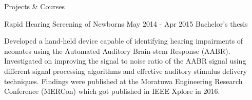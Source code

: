 \documentclass[
	11pt, %
]{./../assets/resume} %
\begin{document}
\begin{rSection}{Projects \& Courses}
    \begin{rShortProject}
    {Rapid Hearing Screening of Newborns}
    {May 2014 - Apr 2015} {Bachelor's thesis}
        \item
        Developed a hand-held device capable of identifying hearing impairments of neonates using the Automated Auditory Brain-stem Response (AABR). Investigated on improving the signal to noise ratio of the AABR signal using different signal processing algorithms and effective auditory stimulus delivery techniques. Findings were published at the Moratuwa Engineering Research Conference (MERCon) which got published in IEEE Xplore in 2016.
    \end{rShortProject}





\end{rSection}
\end{document}
